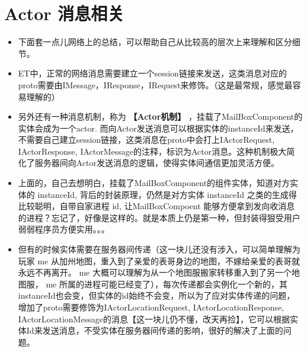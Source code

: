 \documentclass[9pt, b5paper]{article}
\begin{document}
\section{Actor 消息相关}
\label{sec-7}
\begin{itemize}
\item 下面套一点儿网络上的总结，可以帮助自己从比较高的层次上来理解和区分细节。
\item ET中，正常的网络消息需要建立一个session链接来发送，这类消息对应的proto需要由IMessage，IResponse，IRequest来修饰。（这是最常规，感觉最容易理解的）
\item 另外还有一种消息机制，称为 \textbf{【Actor机制】} ，挂载了MailBoxComponent的实体会成为一个actor. 而向Actor发送消息可以根据实体的instanceId来发送，不需要自己建立session链接，这类消息在proto中会打上IActorRequest, IActorResponse, IActorMessage的注释，标识为Actor消息。这种机制极大简化了服务器间向Actor发送消息的逻辑，使得实体间通信更加灵活方便。
\item 上面的，自己去想明白，挂载了MailBoxComponent的组件实体，知道对方实体的 instanceId, 背后的封装原理，仍然是对方实体 instanceId 之类的生成得比较聪明，自带自家进程 id, 让MailBoxCompoent 能够方便拿到发向收消息的进程？忘记了，好像是这样的。就是本质上仍是第一种，但封装得狠受用户弱弱程序员方便实用。。。
\item 但有的时候实体需要在服务器间传递（这一块儿还没有涉入，可以简单理解为玩家 me 从加州地图，重入到了亲爱的表哥身边的地图，不嫁给亲爱的表哥就永远不再离开。 me 大概可以理解为从一个地图服搬家转移重入到了另一个地图服， me 所属的进程可能已经变了），每次传递都会实例化一个新的，其instanceId也会变，但实体的id始终不会变，所以为了应对实体传递的问题，增加了proto需要修饰为IActorLocationRequest, IActorLocationResponse, IActorLocationMessage的消息【这一块儿仍不懂，改天再捡】，它可以根据实体Id来发送消息，不受实体在服务器间传递的影响，很好的解决了上面的问题。
\end{itemize}
\end{document}
